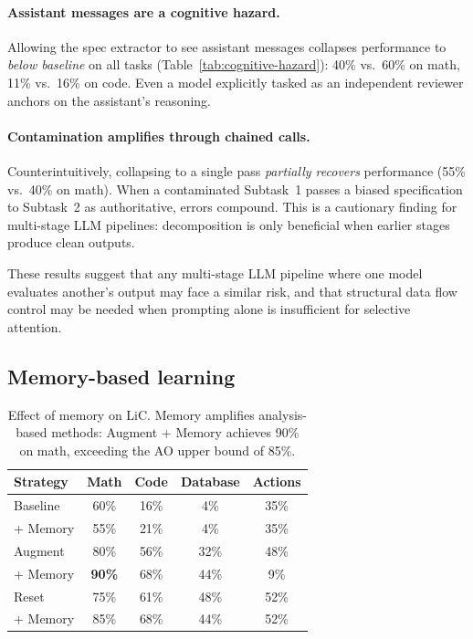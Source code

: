 \documentclass{article} %
\begin{document}
\paragraph{Assistant messages are a cognitive hazard.}
Allowing the spec extractor to see assistant messages collapses performance to \emph{below baseline} on all tasks (Table~\ref{tab:cognitive-hazard}): 40\% vs.\ 60\% on math, 11\% vs.\ 16\% on code. Even a model explicitly tasked as an independent reviewer anchors on the assistant's reasoning.

\paragraph{Contamination amplifies through chained calls.}
Counterintuitively, collapsing to a single pass \emph{partially recovers} performance (55\% vs.\ 40\% on math). When a contaminated Subtask~1 passes a biased specification to Subtask~2 as authoritative, errors compound. This is a cautionary finding for multi-stage LLM pipelines: decomposition is only beneficial when earlier stages produce clean outputs.

These results suggest that any multi-stage LLM pipeline where one model evaluates another's output may face a similar risk, and that structural data flow control may be needed when prompting alone is insufficient for selective attention.


\subsection{Memory-based learning}
\label{sec:memory-discussion}

\begin{table}[t]
\centering
\begin{tabular}{lcccc}
\toprule
\textbf{Strategy} & \textbf{Math} & \textbf{Code} & \textbf{Database} & \textbf{Actions} \\
\midrule
Baseline & 60\% & 16\% & 4\% & 35\% \\
\quad + Memory & 55\% & 21\% & 4\% & 35\% \\
\midrule
Augment & 80\% & 56\% & 32\% & 48\% \\
\quad + Memory & \textbf{90\%} & 68\% & 44\% & 9\% \\
Reset & 75\% & 61\% & 48\% & 52\% \\
\quad + Memory & 85\% & 68\% & 44\% & 52\% \\
\bottomrule
\end{tabular}
\caption{Effect of memory on LiC. Memory amplifies analysis-based methods: Augment + Memory achieves 90\% on math, exceeding the AO upper bound of 85\%.}
\label{tab:lic-memory}
\end{table}
\end{document}
